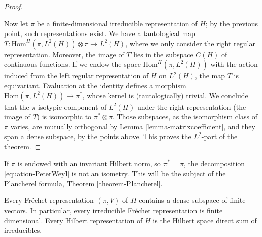 \begin{proof}
\begin{itemize}
\end{itemize}

Now let $\pi$ be a finite-dimensional irreducible representation of $H$; by the previous point, such representations exist. We have a tautological map $T:\text{Hom}^H(\pi, L^2(H)) \otimes \pi\to L^2(H)$, where we only consider the right regular representation. Moreover, the image of $T$ lies in the subspace $C(H)$ of continuous functions. If we endow the space $\text{Hom}^H(\pi, L^2(H))$ with the action induced from the left regular representation of $H$ on $L^2(H)$, the map $T$ is equivariant. Evaluation at the identity defines a morphism $\text{Hom}(\pi, L^2(H)) \to \pi^*$, whose kernel is (tautologically) trivial. We conclude that the $\pi$-isotypic component of $L^2(H)$ under the right representation (the image of $T$) is isomorphic to $\pi^*\otimes \pi$. Those subspaces, as the isomorphism class of $\pi$ varies, are mutually orthogonal by Lemma \ref{lemma-matrixcoefficient}, and they span a dense subspace, by the points above. This proves the $L^2$-part of the theorem.




\end{proof}


\begin{remark}
\label{remark-peterweyl-not-isometry}
 If $\pi$ is endowed with an invariant Hilbert norm, so $\pi^*= \bar\pi$, the decomposition \eqref{equation-PeterWeyl} is not an isometry. This will be the subject of the Plancherel formula, Theorem \ref{theorem-Plancherel}.
\end{remark}


\begin{theorem}
\label{theorem-PeterWeyl-general}
 Every Fr\'echet representation $(\pi,V)$ of $H$ contains a dense subspace of finite vectors. In particular, every irreducible Fr\'echet representation is finite dimensional. Every Hilbert representation of $H$ is the Hilbert space direct sum of irreducibles.
\end{theorem}


